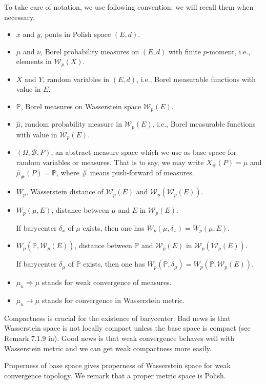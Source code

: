 To take care of notation, we use following convention; we will recall them when necessary,
\begin{itemize}
	\item $x$ and $y$, ponts in Polish space $(E,d)$.
	\item $\mu$ and $\nu$, Borel probability measures on $(E,d)$ with finite $p$-moment, i.e., elements in $\mathcal{W}_p(X)$.
	\item $X$ and $Y$, random variables in $(E, d)$, i.e., Borel measurable functions with value in $E$.
	\item $\mathbb{P}$, Borel measures on Wasserstein space $\mathcal{W}_p(E)$.
	\item \( \hat{\mu} \), random probability measure in $\mathcal{W}_p(E)$, i.e., Borel measurable functions with value in $\mathcal{W}_p(E)$.
	\item $(\Omega, \mathcal{B}, P)$, an abstract measure space which we use as base space for random variables or measures. That is to say, we may write $X_{\#}(P)=\mu$ and $\hat{\mu}_{\#}(P)=\mathbb{P}$, where \# means push-forward of measures.
	\item $W_p$, Wasserstein distance of $\mathcal{W}_p(E)$ and $\mathcal{W}_p(\mathcal{W}_p(E))$.
	\item $W_p(\mu, E)$, distance between $\mu$ and $E$ in $\mathcal{W}_p(E)$.

	      If barycenter $\delta_x$ of $\mu$ exists, then one has $W_p(\mu, \delta_x)=W_p(\mu, E)$.
	\item $W_p(\mathbb{P}, \mathcal{W}_p(E))$, distance between $\mathbb{P}$ and $\mathcal{W}_p(E)$ in $\mathcal{W}_p(\mathcal{W}_p(E))$.

	      If barycenter $\delta_\mu$ of $\mathbb{P}$ exists, then one has $W_p(\mathbb{P}, \delta_\mu)=W_p(\mathbb{P}, \mathcal{W}_p(E))$.
	\item $\mu_n \Rightarrow \mu$ stands for weak convergence of measures.
	\item $\mu_n \rightarrow \mu$ stands for convergence in Wasserstein metric.

\end{itemize}

Compactness is crucial for the existence of barycenter. Bad news is that Wasserstein space is not locally compact unless the base space is compact (see Remark 7.1.9 in\cite{Ambrosio2005}). Good news is that weak convergence behaves well with Wasserstein metric and we can get weak compactness more easily.

Properness of base space gives properness of Wasserstein space for weak convergence topology. We remark that a proper metric space is Polish.

